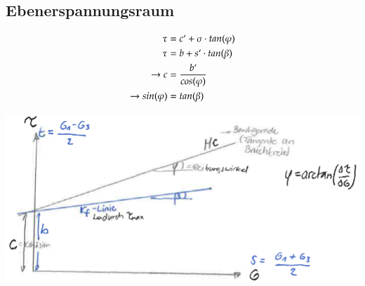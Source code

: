 \begin{minipage}{0.4\linewidth}
\subsection{Ebenerspannungsraum}
	\begin{align*}
		\tau 		&= c`+ \sigma \cdot tan(\varphi) \\
		\tau		&= b + s`\cdot tan(\beta) \\
		\rightarrow c&= \frac{b`}{cos(\varphi)} \\
		\rightarrow sin(\varphi) &= tan(\beta) \\
	\end{align*}
\end{minipage}
\begin{minipage}{0.5\linewidth}
	\includegraphics[width=\linewidth]{images/MC2Ebenerspraum.PNG}
\end{minipage}



